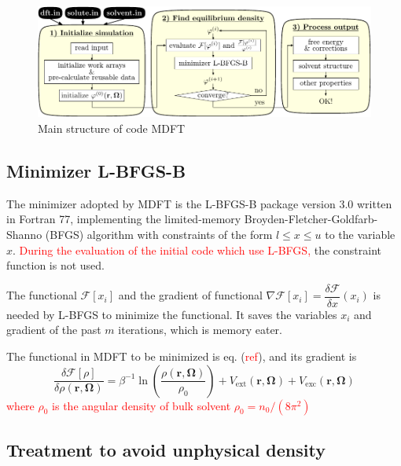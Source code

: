 \begin{figure}[h]
\begin{centering}
\includegraphics{_figure/mdft}
\par\end{centering}

\caption{Main structure of code MDFT\label{fig:code-mdft}}
\end{figure}



\subsection{Minimizer L-BFGS-B}

The minimizer adopted by MDFT is the L-BFGS-B \citep{Zhu_1994_bfgs,Zhu_bfgs_1997_algorithm}
package version 3.0 written in Fortran 77, implementing the limited-memory
Broyden-Fletcher-Goldfarb-Shanno (BFGS) algorithm with constraints
of the form $l\leq x\leq u$ to the variable $x$. \textcolor{red}{During
the evaluation of the initial code which use L-BFGS,} the constraint
function is not used.

The functional $\mathcal{F}[x_{i}]$ and the gradient of functional
$\nabla\mathcal{F}[x_{i}]=\dfrac{\delta\mathcal{F}}{\delta x}(x_{i})$
is needed by L-BFGS to minimize the functional. It saves the variables
$x_{i}$ and gradient of the past $m$ iterations, which is memory
eater.

The functional in MDFT to be minimized is eq. (\textcolor{red}{ref}),
and its gradient is
\begin{equation}
\frac{\delta\mathcal{F}[\rho]}{\delta\rho(\mathbf{r},\mathbf{\Omega})}=\beta^{-1}\ln\left(\dfrac{\rho(\mathbf{r},\mathbf{\Omega})}{\rho_{0}}\right)+V_{\mathrm{ext}}(\mathbf{r},\mathbf{\Omega})+V_{\mathrm{exc}}(\mathbf{r},\mathbf{\Omega})
\end{equation}
\textcolor{red}{where $\rho_{0}$ is the angular density of bulk solvent
$\rho_{0}=n_{0}/\left(8\pi^{2}\right)$}


\subsection{Treatment to avoid unphysical density}

